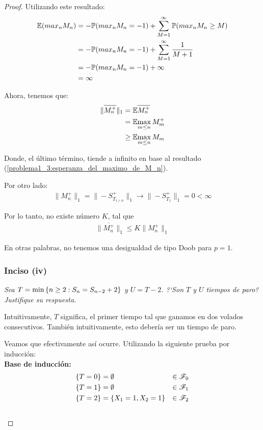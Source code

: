 \begin{proof}
		Utilizando este resultado:
		\begin{align} \label{problema1_3:esperanza_del_maximo_de_M_n}
			\mathbb{E}(max_n M_n) 	&= - \mathbb{P}(max_n M_n = -1) + \sum_{M=1}^{\infty} \mathbb{P}(max_n M_n \geq M) \\
							&= - \mathbb{P}(max_n M_n = -1) + \sum_{M=1}^{\infty} \frac{1}{M+1} \\ 
							&= - \mathbb{P}(max_n M_n = -1) + \infty \\
							&= \infty
		\end{align}						
		
		Ahora, tenemos que:
		\begin{align}
			\|\overline{M_{n}^{+}}\|_1  &=    \mathbb{E}{\overline{M_{n}^{+}}} \\
										&=    \mathbb{E}{\max_{m \leq n}M_m^+} \\
										&\geq \mathbb{E}{\max_{m \leq n}M_m}										
		\end{align}
			
		Donde, el último término, tiende a infinito en base al resultado 
		(\ref{problema1_3:esperanza_del_maximo_de_M_n}).

		Por otro lado:
		\begin{align}
			\|M_n^+\|_1=\|-S_{T_{1\wedge n}}^{+}\|_1  \longrightarrow  \|-S_{T_1}^+\|_1 = 0 < \infty
		\end{align}
		
		Por lo tanto, no existe número $K$, tal que
		\begin{align}
			 \|\overline{M_n^+}\|_1 \leq  K \|M_n^+\|_1
		\end{align}
		
		En otras palabras, no tenemos una desigualdad de tipo Doob para $p=1$.\\
		
	\subsubsection{Inciso (iv)}
	\emph
	{
		Sea $T=\min\left\{ n\geq 2:S_n=S_{n-2} + 2\right\} $ y $U=T-2$. ?`Son $T$ y $U$ 
		tiempos de paro? Justifique su respuesta.\\
	}
	
		Intuitivamente, $T$ significa, el primer tiempo tal que ganamos en dos volados consecutivos.
		También intuitivamente, esto debería ser un tiempo de paro.
		
		Veamos que efectivamente así ocurre. Utilizando la siguiente prueba por inducción:\\
		
		\textbf{Base de inducción:}		
			\begin{align}
				\{T = 0\} 		&= \emptyset  				& 	\in \mathscr{F}_0 \\
				\{T = 1\} 		&= \emptyset  				& 	\in \mathscr{F}_1 \\
				\{T = 2\} 		&= \{ X_1 = 1, X_2 = 1\} 	&	\in \mathscr{F}_2
			\end{align}	\\					
		

\end{proof}
